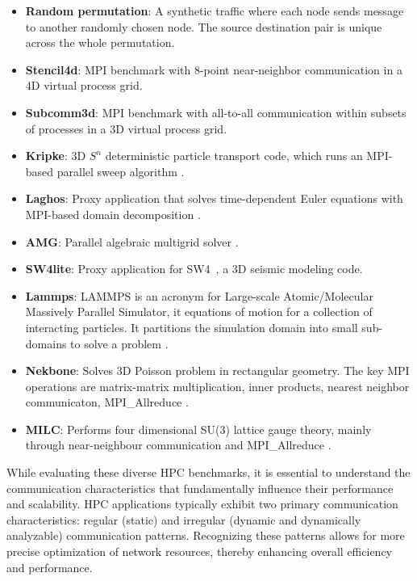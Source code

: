 \begin{itemize}
\item \textbf{Random permutation}: A synthetic traffic where each node sends message to another randomly chosen node. The source destination pair is unique across the whole permutation.
\item \textbf{Stencil4d}: MPI benchmark with 8-point near-neighbor communication in a 4D virtual process grid.
\item \textbf{Subcomm3d}: MPI benchmark with all-to-all communication within subsets of processes in a 3D virtual process grid.
\item \textbf{Kripke}: 3D $S^n$ deterministic particle transport code, which runs an MPI-based parallel sweep algorithm \cite{kripke}. 
\item \textbf{Laghos}: Proxy application that solves time-dependent Euler equations with MPI-based domain decomposition \cite{laghos}.
\item \textbf{AMG}:  Parallel algebraic multigrid solver \cite{amg}.
\item \textbf{SW4lite}: Proxy application for SW4~\cite{sjogreen2018sw4}, a 3D seismic modeling code.
\item \textbf{Lammps}: LAMMPS is an acronym for Large-scale Atomic/Molecular Massively Parallel Simulator, it equations of motion for a collection of interacting particles. It partitions the simulation domain into small sub-domains to solve a problem \cite{thompson2022lammps}.
\item \textbf{Nekbone}: Solves 3D Poisson problem in rectangular geometry. The key MPI operations are matrix-matrix multiplication, inner products, nearest neighbor communicaton, MPI\_Allreduce \cite{gong2016nekbone}.
\item \textbf{MILC}: Performs four dimensional SU(3) lattice gauge theory, mainly through near-neighbour communication and MPI\_Allreduce \cite{gottlieb2001benchmarking}.
\end{itemize}

While evaluating these diverse HPC benchmarks, it is essential to understand the communication characteristics that fundamentally influence their performance and scalability. HPC applications typically exhibit two primary communication characteristics: regular (static) and irregular (dynamic and dynamically analyzable) communication patterns. Recognizing these patterns allows for more precise optimization of network resources, thereby enhancing overall efficiency and performance.

